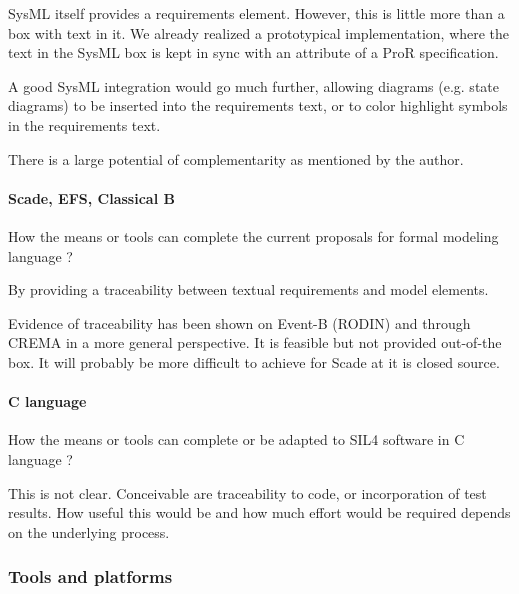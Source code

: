 \begin{author_comment}
SysML itself provides a requirements element.  However, this is little more than a box with text in it.  We already realized a prototypical implementation, where the text in the SysML box is kept in sync with an attribute of a ProR specification.

A good SysML integration would go much further, allowing diagrams (e.g. state diagrams) to be inserted into the requirements text, or to color highlight symbols in the requirements text.
\end{author_comment}

\begin{assessor2}
There is a large potential of complementarity as mentioned by the author.
\end{assessor2}

\paragraph{Scade, EFS, Classical B}
How the means or tools can complete the current proposals for formal modeling language ?

\begin{author_comment}
By providing a traceability between textual requirements and model elements.
\end{author_comment}

\begin{assessor2}
Evidence of traceability has been shown on Event-B (RODIN) and through CREMA in a more general perspective. It is feasible but not provided out-of-the box. It will probably be more difficult to achieve for Scade at it is closed source.
\end{assessor2}

\paragraph{C language}
How the means or tools can complete or be adapted to SIL4 software in C language ?

\begin{author_comment}
This is not clear.  Conceivable are traceability to code, or incorporation of test results.  How useful this would be and how much effort would be required depends on the underlying process.
\end{author_comment}

\subsubsection{Tools and platforms}

